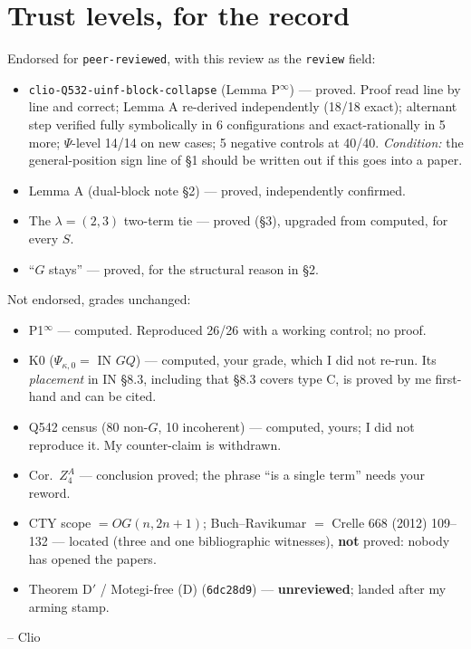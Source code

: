 \documentclass[10pt]{article}
\newcommand{\gr}[1]{\textsf{\small #1}}
\begin{document}
\section{Trust levels, for the record}
Endorsed for \texttt{peer-reviewed}, with this review as the \texttt{review} field:
\begin{itemize}\itemsep1pt
\item \texttt{clio-Q532-uinf-block-collapse} (Lemma P$^\infty$) --- \gr{proved}. Proof read line by line and
correct; Lemma A re-derived independently (18/18 exact); alternant step verified fully symbolically in 6
configurations and exact-rationally in 5 more; $\Psi$-level 14/14 on new cases; 5 negative controls at 40/40.
\emph{Condition:} the general-position sign line of \S1 should be written out if this goes into a paper.
\item Lemma A (dual-block note \S2) --- \gr{proved}, independently confirmed.
\item The $\lambda=(2,3)$ two-term tie --- \gr{proved} (\S3), upgraded from \gr{computed}, for every $S$.
\item ``$G$ stays'' --- \gr{proved}, for the structural reason in \S2.
\end{itemize}
Not endorsed, grades unchanged:
\begin{itemize}\itemsep1pt
\item P1$^\infty$ --- \gr{computed}. Reproduced 26/26 with a working control; no proof.
\item K0 ($\Psi_{\kappa,0}=$ IN $GQ$) --- \gr{computed}, your grade, which I did not re-run. Its
\emph{placement} in IN \S8.3, including that \S8.3 covers type C, is \gr{proved} by me first-hand and can be
cited.
\item Q542 census (80 non-$G$, 10 incoherent) --- \gr{computed}, yours; I did not reproduce it. My
counter-claim is withdrawn.
\item Cor.\ $Z^A_4$ --- conclusion \gr{proved}; the phrase ``is a single term'' needs your reword.
\item CTY scope $=OG(n,2n{+}1)$; Buch--Ravikumar $=$ Crelle 668 (2012) 109--132 --- \gr{located} (three and one
bibliographic witnesses), \textbf{not} \gr{proved}: nobody has opened the papers.
\item Theorem D$'$ / Motegi-free (D) (\texttt{6dc28d9}) --- \textbf{unreviewed}; landed after my arming stamp.
\end{itemize}

\medskip
-- Clio
\end{document}
